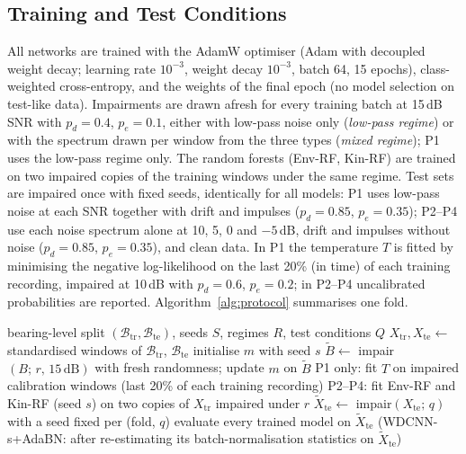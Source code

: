 \documentclass[conference]{IEEEtran}
\begin{document}
\subsection{Training and Test Conditions}
All networks are trained with the AdamW optimiser (Adam with decoupled weight decay; learning rate $10^{-3}$, weight decay $10^{-3}$, batch 64, 15 epochs), class-weighted cross-entropy, and the weights of the final epoch (no model selection on test-like data). Impairments are drawn afresh for every training batch at 15\,dB SNR with $p_d=0.4$, $p_e=0.1$, either with low-pass noise only (\emph{low-pass regime}) or with the spectrum drawn per window from the three types (\emph{mixed regime}); P1 uses the low-pass regime only. The random forests (Env-RF, Kin-RF) are trained on two impaired copies of the training windows under the same regime. Test sets are impaired once with fixed seeds, identically for all models: P1 uses low-pass noise at each SNR together with drift and impulses ($p_d=0.85$, $p_e=0.35$); P2--P4 use each noise spectrum alone at 10, 5, 0 and $-5$\,dB, drift and impulses without noise ($p_d=0.85$, $p_e=0.35$), and clean data. In P1 the temperature $T$ is fitted by minimising the negative log-likelihood on the last 20\% (in time) of each training recording, impaired at 10\,dB with $p_d=0.6$, $p_e=0.2$; in P2--P4 uncalibrated probabilities are reported. Algorithm~\ref{alg:protocol} summarises one fold.

\begin{algorithm}[t]
\caption{One fold of the evaluation}
\label{alg:protocol}
\footnotesize
\begin{algorithmic}[1]
\Require bearing-level split $(\mathcal{B}_{\text{tr}},\mathcal{B}_{\text{te}})$, seeds $S$, regimes $R$, test conditions $Q$
\State $X_{\text{tr}},X_{\text{te}}\gets$ standardised windows of $\mathcal{B}_{\text{tr}}$, $\mathcal{B}_{\text{te}}$
    \State initialise $m$ with seed $s$
      \State $\tilde B\gets$ impair$(B;\,r,\,15\,\text{dB})$ with fresh randomness; update $m$ on $\tilde B$
    \EndFor
    \State P1 only: fit $T$ on impaired calibration windows (last 20\% of each training recording)
  \EndFor
  \State P2--P4: fit Env-RF and Kin-RF (seed $s$) on two copies of $X_{\text{tr}}$ impaired under $r$
\EndFor
{}
  \State $\tilde X_{\text{te}}\gets$ impair$(X_{\text{te}};\,q)$ with a seed fixed per (fold, $q$)
  \State evaluate every trained model on $\tilde X_{\text{te}}$ (WDCNN-s+AdaBN: after re-estimating its batch-normalisation statistics on $\tilde X_{\text{te}}$)
\EndFor
\end{algorithmic}
\end{algorithm}
\end{document}
